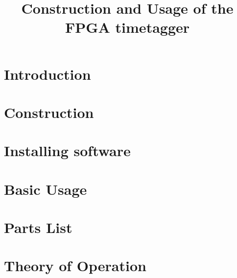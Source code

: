 \documentclass{report}
\begin{document}
\title{Construction and Usage of the FPGA timetagger}
\date{}
\maketitle

\tableofcontents

\chapter{Introduction}


\chapter{Construction}
\label{Ch:Construction}


\chapter{Installing software}
\label{Ch:Installing}


\chapter{Basic Usage}
\label{Ch:BasicUsage}


%

\appendix
\chapter{Parts List}
\label{Ch:BoM}


\chapter{Theory of Operation}
\label{Ch:Theory}

\end{document}
